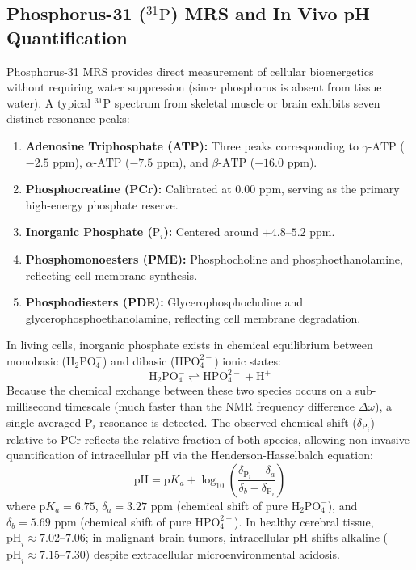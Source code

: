 \documentclass[11pt,a4paper]{article}
\begin{document}
\subsection{Phosphorus-31 (\texorpdfstring{$^{31}\text{P}$}{31P}) MRS and In Vivo pH Quantification}
Phosphorus-31 MRS provides direct measurement of cellular bioenergetics without requiring water suppression (since phosphorus is absent from tissue water). A typical $^{31}\text{P}$ spectrum from skeletal muscle or brain exhibits seven distinct resonance peaks:
\begin{enumerate}
    \item \textbf{Adenosine Triphosphate (ATP):} Three peaks corresponding to $\gamma\text{-ATP}$ ($-2.5\text{ ppm}$), $\alpha\text{-ATP}$ ($-7.5\text{ ppm}$), and $\beta\text{-ATP}$ ($-16.0\text{ ppm}$).
    \item \textbf{Phosphocreatine (PCr):} Calibrated at $0.00\text{ ppm}$, serving as the primary high-energy phosphate reserve.
    \item \textbf{Inorganic Phosphate ($\text{P}_i$):} Centered around $+4.8\text{--}5.2\text{ ppm}$.
    \item \textbf{Phosphomonoesters (PME):} Phosphocholine and phosphoethanolamine, reflecting cell membrane synthesis.
    \item \textbf{Phosphodiesters (PDE):} Glycerophosphocholine and glycerophosphoethanolamine, reflecting cell membrane degradation.
\end{enumerate}

\begin{physicsbox}
In living cells, inorganic phosphate exists in chemical equilibrium between monobasic ($\text{H}_2\text{PO}_4^-$) and dibasic ($\text{HPO}_4^{2-}$) ionic states:
\begin{equation}
    \text{H}_2\text{PO}_4^- \rightleftharpoons \text{HPO}_4^{2-} + \text{H}^+
\end{equation}
Because the chemical exchange between these two species occurs on a sub-millisecond timescale (much faster than the NMR frequency difference $\Delta \omega$), a single averaged $\text{P}_i$ resonance is detected. The observed chemical shift ($\delta_{\text{P}_i}$) relative to PCr reflects the relative fraction of both species, allowing non-invasive quantification of intracellular $\text{pH}$ via the Henderson-Hasselbalch equation:
\begin{equation}
    \text{pH} = \text{p}K_a + \log_{10}\left( \frac{\delta_{\text{P}_i} - \delta_a}{\delta_b - \delta_{\text{P}_i}} \right)
\end{equation}
where $\text{p}K_a = 6.75$, $\delta_a = 3.27\text{ ppm}$ (chemical shift of pure $\text{H}_2\text{PO}_4^-$), and $\delta_b = 5.69\text{ ppm}$ (chemical shift of pure $\text{HPO}_4^{2-}$). In healthy cerebral tissue, $\text{pH}_i \approx 7.02\text{--}7.06$; in malignant brain tumors, intracellular pH shifts alkaline ($\text{pH}_i \approx 7.15\text{--}7.30$) despite extracellular microenvironmental acidosis.
\end{physicsbox}
\end{document}
